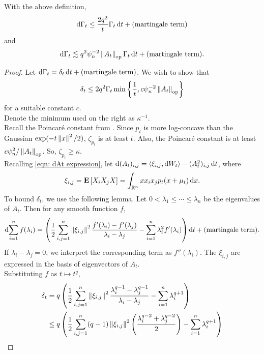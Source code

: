 		\begin{flem}
			\label{primary bounds chen}
			With the above definition,
			\begin{equation}
				\label{kls chen bound A}
				\operatorname{d}\!{\Gamma_t} \leq \frac{2q^2}{t}\Gamma_t\operatorname{d}\!{t} + (\text{martingale term})
			\end{equation}
			and
			\begin{equation}
				\label{kls chen bound B}
				\operatorname{d}\!{\Gamma_t} \lesssim q^2\psi_n^{-2}\left\lVert A_t\right\rVert_{\text{op}}\Gamma_t\operatorname{d}\!{t} + (\text{martingale term}).
			\end{equation}
		\end{flem}
		\begin{proof}
			Let $\operatorname{d}\!{\Gamma_t} = \delta_t \operatorname{d}\!{t} + \text{(martingale term)}$. We wish to show that
			\[ \delta_t \leq 2q^2\Gamma_t \min\left\{ \frac{1}{t} , c\psi_n^{-2}\left\lVert A_t\right\rVert_{\text{op}} \right\} \]
			for a suitable constant $c$.\\
			Denote the minimum used on the right as $\kappa^{-1}$.\\
			Recall the Poincar\'{e} constant from .
			Since $p_t$ is more log-concave than the Gaussian $\exp(-t\left\lVert x\right\rVert^2/2)$, $\zeta_{p_t}$ is at least $t$.
			Also, the Poincar\'{e} constant is at least $c\psi_n^2 / \left\lVert A_t\right\rVert_{\text{op}}$. So, $\zeta_{p_t} \geq \kappa$.\\
			Recalling \eqref{eqn: dAt expression}, let $\operatorname{d}\!{(A_t)_{i,j}} = \langle\xi_{i,j},\operatorname{d}\!{W}_t\rangle - (A_t^2)_{i,j} \operatorname{d}\!{t}$, where
			\[ \xi_{i,j} = \textbf{E}\left[ X_i X_j X \right] = \int_{\mathbb{R}^n} x x_i x_j p_t(x+\mu_t) \operatorname{d}\!{x}. \]
			To bound $\delta_t$, we use the following lemma. Let $0 < \lambda_1 \leq \cdots \leq \lambda_n$ be the eigenvalues of $A_t$. Then for any smooth function $f$,
			\[ \operatorname{d}\!{ \sum_{i=1}^n f(\lambda_i) } = \left( \frac{1}{2} \sum_{i,j = 1}^n \left\lVert\xi_{i,j}\right\rVert^2 \frac{f'(\lambda_i) - f'(\lambda_j)}{\lambda_i - \lambda_j} - \sum_{i=1}^n \lambda_i^2 f'(\lambda_i) \right) \operatorname{d}\!{t} + \text{(martingale term)}. \]
			If $\lambda_i - \lambda_j = 0$, we interpret the corresponding term as $f''(\lambda_i)$. The $\xi_{i,j}$ are expressed in the basis of eigenvectors of $A_t$.\\
			Substituting $f$ as $t \mapsto t^q$,
			\begin{align*}
				\delta_t &= q \left( \frac{1}{2} \sum_{i,j = 1}^n \norm{\xi_{i,j}}^2 \frac{\lambda_i^{q-1} - \lambda_j^{q-1}}{\lambda_i - \lambda_j} - \sum_{i=1}^n \lambda_i^{q+1} \right) \\
					&\leq q \left( \frac{1}{2} \sum_{i,j = 1}^n (q-1) \norm{\xi_{i,j}}^2 \left(\frac{\lambda_i^{q-2} + \lambda_j^{q-2}}{2}\right) - \sum_{i=1}^n \lambda_i^{q+1} \right) \\

\end{align*}
\end{proof}
